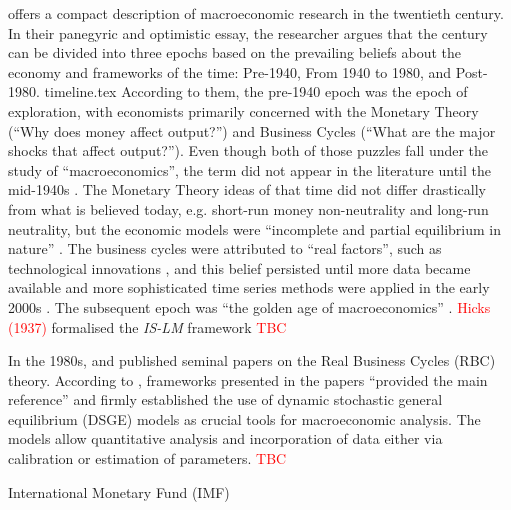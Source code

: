 \textcite{blanchard_2000_what} offers a compact description of macroeconomic research in the twentieth century. In their panegyric and optimistic essay, the researcher argues that the century can be divided into three epochs based on the prevailing beliefs about the economy and frameworks of the time: Pre-1940, From 1940 to 1980, and Post-1980. 
{timeline.tex}
According to them, the pre-1940 epoch was the epoch of exploration, with economists primarily concerned with the Monetary Theory (``Why does money affect output?'') and Business Cycles (``What are the major shocks that affect output?''). Even though both of those puzzles fall under the study of ``macroeconomics'', the term did not appear in the literature until the mid-1940s \parencite{blanchard_2000_what}. The Monetary Theory ideas of that time did not differ drastically from what is believed today, e.g. short-run money non-neutrality and long-run neutrality, but the economic models were ``incomplete and partial equilibrium in nature'' \parencite[1377]{blanchard_2000_what}. The business cycles were attributed to ``real factors'', such as technological innovations \parencite{blanchard_2000_what}, and this belief persisted until more data became available and more sophisticated time series methods were applied in the early 2000s \parencite[3]{jordigal_2015_monetary}. The subsequent epoch was ``the golden age of macroeconomics'' \parencite[1379]{blanchard_2000_what}. \textcolor{red}{Hicks (1937)} formalised the \textit{IS-LM} framework \textcolor{red}{TBC}

In the 1980s, \textcite{kydland_1982_time} and \textcite{prescott_1986_theory} published seminal papers on the Real Business Cycles (RBC) theory. According to \textcite[2]{jordigal_2015_monetary}, frameworks presented in the papers ``provided the main reference'' and firmly established the use of dynamic stochastic general equilibrium (DSGE) models as crucial tools for macroeconomic analysis. The models allow quantitative analysis and incorporation of data either via calibration or estimation of parameters. \textcolor{red}{TBC}

International Monetary Fund (IMF)